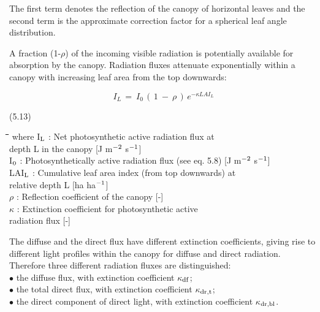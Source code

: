  
The first term denotes the reflection of the canopy of horizontal leaves and the second
term is the approximate correction factor for a spherical leaf angle distribu\-tion.



A fraction (1-$\rho$) of the incoming visible radiation is potentially available for absorp\-tion by
the canopy. Radiation fluxes attenuate exponentially within a canopy with increasing leaf
area from the top downwards:

\begin{displaymath}
I _{L~} =~ I _{0} \, (\, 1~-~\rho \, )\, e ^{- \kappa LAI _{L} }
\end{displaymath}


\strut\hfill (5.13)

\nwln
\begin{tabbing}
\hspace{1.27cm}\=\hspace{1.27cm}\=\hspace{1.27cm}\=\hspace{1.27cm}\=%
\hspace{1.27cm}\=\hspace{1.27cm}\=\hspace{1.27cm}\=\hspace{1.27cm}\=%
\hspace{1.27cm}\=\hspace{1.27cm}\=\kill
where I$_{{\rm L}}$ : Net photosynthetic active radiation flux at \\
   depth L in the canopy        [J m$^{{\rm -2}}$ s$^{{\rm -1}}$]\\
I$_{{\rm 0}}$ : Photosynthetically active radia\-tion flux (see eq. 5.8)        [J m$^{{\rm -2}}$ s$^{{\rm -1}}$]\\
LAI$_{{\rm L}}$ : Cumulative leaf area index (from top downwards) at \\
   relative depth L          [ha ha$^{{\rm -1}}$]\\
$\rho$ : Reflection coefficient of the canopy        [-]\\
$\kappa$ : Extinction coefficient for photosynthetic active \\
   radiation flux        [-]
\end{tabbing}



The diffuse and the direct flux have different extinction coefficients, giving rise to
different light profiles within the canopy for diffuse and direct radiation. Therefore three
different radiation fluxes are distinguished:\\
$\bullet$ the diffuse flux, with extinction coefficient $\kappa$$_{{\rm df}}$;\\
$\bullet$ the total direct flux, with extinction coefficient $\kappa$$_{{\rm dr,t}}$;\\
$\bullet$ the direct component of direct light, with extinction coefficient $\kappa$$_{{\rm dr,bl}}$.



